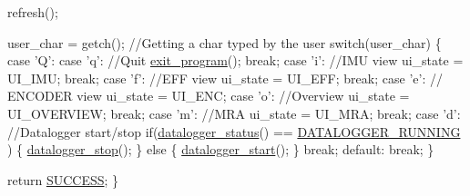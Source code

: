 \begin{DoxyCode}
        refresh();

        user\_char = getch(); \textcolor{comment}{//Getting a char typed by the user}
        \textcolor{keywordflow}{switch}(user\_char)
        \{
                \textcolor{keywordflow}{case} \textcolor{charliteral}{'Q'}:
                \textcolor{keywordflow}{case} \textcolor{charliteral}{'q'}: \textcolor{comment}{//Quit}
                        \hyperlink{main2_8c_a5f05ce725141ddfab683e059b1cd95ea}{exit\_program}();
                        \textcolor{keywordflow}{break};
                \textcolor{keywordflow}{case} \textcolor{charliteral}{'i'}: \textcolor{comment}{//IMU view}
                        ui\_state = UI\_IMU;
                        \textcolor{keywordflow}{break};
                \textcolor{keywordflow}{case} \textcolor{charliteral}{'f'}: \textcolor{comment}{//EFF view}
                        ui\_state = UI\_EFF;
                        \textcolor{keywordflow}{break};
                \textcolor{keywordflow}{case} \textcolor{charliteral}{'e'}: \textcolor{comment}{// ENCODER view}
                        ui\_state = UI\_ENC;
                \textcolor{keywordflow}{case} \textcolor{charliteral}{'o'}: \textcolor{comment}{//Overview}
                        ui\_state = UI\_OVERVIEW;
                        \textcolor{keywordflow}{break};
                \textcolor{keywordflow}{case} \textcolor{charliteral}{'m'}: \textcolor{comment}{//MRA}
                        ui\_state = UI\_MRA;
                        \textcolor{keywordflow}{break};
                \textcolor{keywordflow}{case} \textcolor{charliteral}{'d'}: \textcolor{comment}{//Datalogger start/stop}
                  \textcolor{keywordflow}{if}(\hyperlink{datalogger_8c_a46fd1290d9ee97d5fc7171e1e0dcb0aa}{datalogger\_status}() == \hyperlink{datalogger_8h_a2cf92051a019c8ec1b5c4f5380758f62}{DATALOGGER\_RUNNING}
      )
                  \{
                    \hyperlink{datalogger_8c_aae2ffbc6cbf8f1cfecceb42c5139530a}{datalogger\_stop}();
                  \}
                  \textcolor{keywordflow}{else}
                  \{
                    \hyperlink{datalogger_8c_a1f254ef380d595d6605c10811fd0dee6}{datalogger\_start}();
                  \}
                  \textcolor{keywordflow}{break};
               \textcolor{keywordflow}{default}:
                 \textcolor{keywordflow}{break};
        \}

        \textcolor{keywordflow}{return} \hyperlink{calibration_2calibration_8h_aa90cac659d18e8ef6294c7ae337f6b58}{SUCCESS};
\}
\end{DoxyCode}


